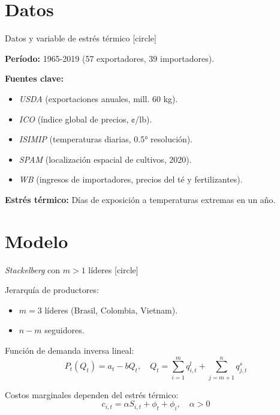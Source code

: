 \section{Datos}

\begin{frame}{Datos y variable de estrés térmico}
    \label{frame:datos}
    [circle]
    \begin{wideitemize}
        \item \textbf{Período:} 1965-2019 (57 exportadores, 39 importadores).            
        \item \textbf{Fuentes clave:}
            \begin{itemize}
                \item \textit{USDA} (exportaciones anuales, mill. 60 kg).
                \item \textit{ICO} (índice global de precios, ¢/lb).
                \item \textit{ISIMIP} (temperaturas diarias, 0.5° resolución).
                \item \textit{SPAM} (localización espacial de cultivos, 2020).
                \item \textit{WB} (ingresos de importadores, precios del té y fertilizantes).
            \end{itemize}

        \item \textbf{Estrés térmico:} Días de exposición a temperaturas extremas en un año. \hyperlink{frame:variable_estres}{}
    \end{wideitemize}
\end{frame}

\section{Modelo}

\begin{frame}{\textit{Stackelberg} con  $m>1$ líderes}
    [circle]
    \begin{wideitemize}
        \item Jerarquía de productores:
        \begin{itemize}
            \item $m = 3$ líderes (Brasil, Colombia, Vietnam).
            \item $n-m$ seguidores.
        \end{itemize}
        \item Función de demanda inversa lineal:
        $$ P_{t}(Q_{t}) = a_{t} - b Q_{t}, \quad Q_{t} = \sum_{i=1}^{m} q_{i,t}^{l} + \sum_{j=m+1}^{n} q_{j,t}^{s} $$
        \item Costos marginales dependen del estrés térmico:
        $$ c_{i,t} =  \alpha S_{i,t} + \phi_{t} + \phi_{i}, \quad \alpha > 0 $$
    \end{wideitemize}
\end{frame}

